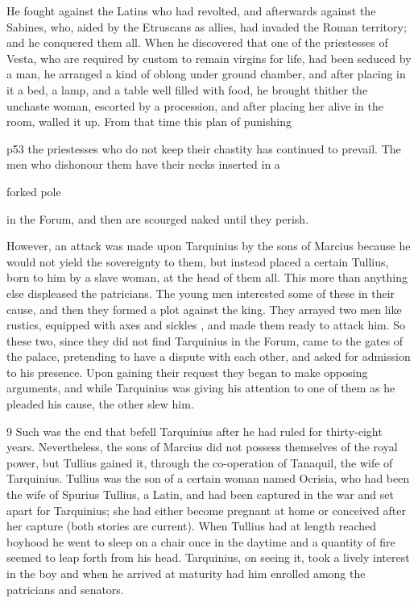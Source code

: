 He fought against the Latins who had revolted, and afterwards against the Sabines, who, aided by the Etruscans as allies, had invaded the Roman territory; and he conquered them all. When he discovered that one of the priestesses of Vesta, who are required by custom to remain virgins for life, had been seduced by a man, he arranged a kind of oblong under ­ground chamber, and after pla­cing in it a bed, a lamp, and a table well filled with food, he brought thither the unchaste woman, escorted by a procession, and after pla­cing her alive in the room, walled it up. From that time this plan of punishing

p53 the priestesses who do not keep their chastity has continued to prevail. The men who dishonour them have their necks inserted in a

forked pole

in the Forum, and then are scourged naked until they perish.

However, an attack was made upon Tarquinius by the sons of Marcius because he would not yield the sovereignty to them, but instead placed a certain Tullius, born to him by a slave woman, at the head of them all. This more than anything else displeased the patricians. The young men interested some of these in their cause, and then they formed a plot against the king. They arrayed two men like rustics, equipped with axes and sickles , and made them ready to attack him. So these two, since they did not find Tarquinius in the Forum, came to the gates of the palace, pretending to have a dispute with each other, and asked for admission to his presence. Upon gaining their request they began to make opposing arguments, and while Tarquinius was giving his attention to one of them as he pleaded his cause, the other slew him.

9 Such was the end that befell Tarquinius after he had ruled for thirty-eight years. Nevertheless, the sons of Marcius did not possess themselves of the royal power, but Tullius gained it, through the co-operation of Tanaquil, the wife of Tarquinius. Tullius was the son of a certain woman named Ocrisia, who had been the wife of Spurius Tullius, a Latin, and had been captured in the war and set apart for Tarquinius; she had either become pregnant at home or conceived after her capture (both stories are current). When Tullius had at length reached boyhood he went to sleep on a chair once in the daytime and a quantity of fire seemed to leap forth from his head. Tarquinius, on seeing it, took a lively interest in the boy and when he arrived at maturity had him enrolled among the patricians and senators.

